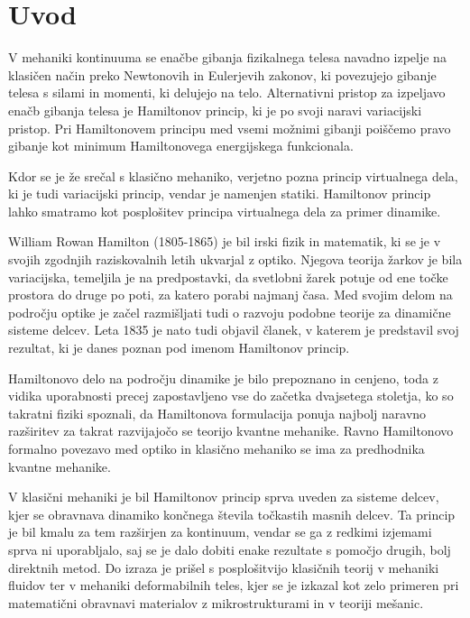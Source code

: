 \chapter{Uvod}


V mehaniki kontinuuma se enačbe gibanja fizikalnega telesa navadno izpelje
na klasičen način preko Newtonovih in Eulerjevih zakonov, ki povezujejo
gibanje telesa s silami in momenti, ki delujejo na telo. Alternativni pristop
za izpeljavo enačb gibanja telesa je Hamiltonov princip, ki je po svoji
naravi variacijski pristop. Pri Hamiltonovem principu med vsemi možnimi
gibanji poiščemo pravo gibanje kot minimum Hamiltonovega energijskega funkcionala.

Kdor se je že srečal s klasično mehaniko, verjetno pozna princip virtualnega dela,
ki je tudi variacijski princip, vendar je namenjen statiki. Hamiltonov
princip lahko smatramo kot posplošitev principa virtualnega dela za primer dinamike.

William Rowan Hamilton (1805-1865) je bil irski fizik in matematik, ki se je
v svojih zgodnjih raziskovalnih letih ukvarjal z optiko. Njegova teorija žarkov
je bila variacijska, temeljila je na predpostavki, da svetlobni žarek potuje
od ene točke prostora do druge po poti, za katero porabi najmanj časa. Med
svojim delom na področju optike je začel razmišljati tudi o razvoju podobne
teorije za dinamične sisteme delcev. Leta 1835 je nato tudi objavil članek, v katerem
je predstavil svoj rezultat, ki je danes poznan pod imenom Hamiltonov princip.

Hamiltonovo delo na področju dinamike je bilo prepoznano in cenjeno, toda
z vidika uporabnosti precej zapostavljeno vse do začetka dvajsetega stoletja,
ko so takratni fiziki spoznali, da Hamiltonova formulacija ponuja najbolj
naravno razširitev za takrat razvijajočo se teorijo kvantne mehanike.
Ravno Hamiltonovo formalno povezavo med optiko in klasično mehaniko se ima
za predhodnika kvantne mehanike.

V klasični mehaniki je bil Hamiltonov princip sprva uveden za sisteme delcev,
kjer se obravnava dinamiko končnega števila točkastih masnih delcev.
Ta princip je bil kmalu za tem razširjen za kontinuum, vendar se ga
z redkimi izjemami sprva ni uporabljalo, saj se je dalo dobiti enake rezultate
s pomočjo drugih, bolj direktnih metod. Do izraza je prišel s posplošitvijo
klasičnih teorij v mehaniki fluidov ter v mehaniki deformabilnih teles,
kjer se je izkazal kot zelo primeren pri matematični obravnavi materialov z mikrostrukturami
in v teoriji mešanic.


